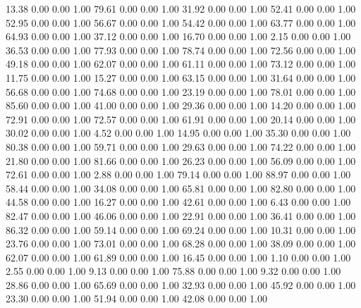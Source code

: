    13.38   0.00   0.00   1.00
   79.61   0.00   0.00   1.00
   31.92   0.00   0.00   1.00
   52.41   0.00   0.00   1.00
   52.95   0.00   0.00   1.00
   56.67   0.00   0.00   1.00
   54.42   0.00   0.00   1.00
   63.77   0.00   0.00   1.00
   64.93   0.00   0.00   1.00
   37.12   0.00   0.00   1.00
   16.70   0.00   0.00   1.00
    2.15   0.00   0.00   1.00
   36.53   0.00   0.00   1.00
   77.93   0.00   0.00   1.00
   78.74   0.00   0.00   1.00
   72.56   0.00   0.00   1.00
   49.18   0.00   0.00   1.00
   62.07   0.00   0.00   1.00
   61.11   0.00   0.00   1.00
   73.12   0.00   0.00   1.00
   11.75   0.00   0.00   1.00
   15.27   0.00   0.00   1.00
   63.15   0.00   0.00   1.00
   31.64   0.00   0.00   1.00
   56.68   0.00   0.00   1.00
   74.68   0.00   0.00   1.00
   23.19   0.00   0.00   1.00
   78.01   0.00   0.00   1.00
   85.60   0.00   0.00   1.00
   41.00   0.00   0.00   1.00
   29.36   0.00   0.00   1.00
   14.20   0.00   0.00   1.00
   72.91   0.00   0.00   1.00
   72.57   0.00   0.00   1.00
   61.91   0.00   0.00   1.00
   20.14   0.00   0.00   1.00
   30.02   0.00   0.00   1.00
    4.52   0.00   0.00   1.00
   14.95   0.00   0.00   1.00
   35.30   0.00   0.00   1.00
   80.38   0.00   0.00   1.00
   59.71   0.00   0.00   1.00
   29.63   0.00   0.00   1.00
   74.22   0.00   0.00   1.00
   21.80   0.00   0.00   1.00
   81.66   0.00   0.00   1.00
   26.23   0.00   0.00   1.00
   56.09   0.00   0.00   1.00
   72.61   0.00   0.00   1.00
    2.88   0.00   0.00   1.00
   79.14   0.00   0.00   1.00
   88.97   0.00   0.00   1.00
   58.44   0.00   0.00   1.00
   34.08   0.00   0.00   1.00
   65.81   0.00   0.00   1.00
   82.80   0.00   0.00   1.00
   44.58   0.00   0.00   1.00
   16.27   0.00   0.00   1.00
   42.61   0.00   0.00   1.00
    6.43   0.00   0.00   1.00
   82.47   0.00   0.00   1.00
   46.06   0.00   0.00   1.00
   22.91   0.00   0.00   1.00
   36.41   0.00   0.00   1.00
   86.32   0.00   0.00   1.00
   59.14   0.00   0.00   1.00
   69.24   0.00   0.00   1.00
   10.31   0.00   0.00   1.00
   23.76   0.00   0.00   1.00
   73.01   0.00   0.00   1.00
   68.28   0.00   0.00   1.00
   38.09   0.00   0.00   1.00
   62.07   0.00   0.00   1.00
   61.89   0.00   0.00   1.00
   16.45   0.00   0.00   1.00
    1.10   0.00   0.00   1.00
    2.55   0.00   0.00   1.00
    9.13   0.00   0.00   1.00
   75.88   0.00   0.00   1.00
    9.32   0.00   0.00   1.00
   28.86   0.00   0.00   1.00
   65.69   0.00   0.00   1.00
   32.93   0.00   0.00   1.00
   45.92   0.00   0.00   1.00
   23.30   0.00   0.00   1.00
   51.94   0.00   0.00   1.00
   42.08   0.00   0.00   1.00
